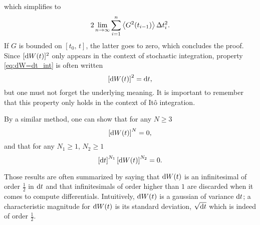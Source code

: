 which simplifies to
\begin{equation}
	2 \lim_{n\rightarrow\infty} \sum_{i=1}^n \esp{G^2(t_{i-1})}\Delta t_i^2.
\end{equation}
If $G$ is bounded on $[t_0,\,t]$, the latter goes to zero, which concludes the proof. Since $[\rm dW(t)]^2$ only appears in the context of stochastic integration, property \eqref{eq:dW=dt_int} is often written
\begin{equation} \label{eq:dw2=dt}
	\left[\rm dW(t)\right]^2 = \rm dt,  	
\end{equation}  
but one must not forget the underlying meaning. It is important to remember that this property only holds in the context of Itô integration.

By a similar method, one can show that for any $N \ge 3$
\begin{equation}
	\left[\rm dW(t)\right]^{N} = 0,
\end{equation}
and that for any $N_1 \ge 1$, $N_2 \ge 1$
\begin{equation} \label{eq:dwdt=0}
	\left[\rm dt\right]^{N_1}\left[\rm dW(t)\right]^{N_2} = 0. 
\end{equation}

Those results are often summarized by saying that $\rm dW(t)$ is an infinitesimal of order $\frac{1}{2}$ in $\rm dt$ and that infinitesimals of order higher than $1$ are discarded when it comes to compute differentials. Intuitively, $\rm dW(t)$ is a gaussian of variance $\rm dt$; a characteristic magnitude for $\rm dW(t)$ is its standard deviation, $\sqrt{\rm dt}$ which is indeed of order $\frac{1}{2}$.

